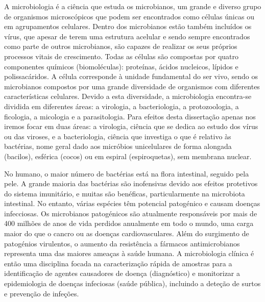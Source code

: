 A microbiologia é a ciência que estuda os microbianos, um grande e diverso grupo de organismos microscópicos que podem ser encontrados como células únicas ou em agrupamentos celulares. Dentro dos microbianos estão também incluídos os vírus, que apesar de terem uma estrutura acelular e sendo sempre encontrados como parte de outros microbianos, são capazes de realizar os seus próprios processos vitais de crescimento. Todas as células são compostas por quatro componentes químicos (biomoléculas): proteínas, ácidos nucleicos, lípidos e polissacáridos. A célula corresponde à unidade fundamental do ser vivo, sendo os microbianos compostos por uma grande diversidade de organismos com diferentes características celulares. Devido a esta diversidade, a microbiologia encontra-se dividida em diferentes áreas: a virologia, a bacteriologia, a protozoologia, a ficologia, a micologia e a parasitologia. Para efeitos desta dissertação apenas nos iremos focar em duas áreas: a virologia, ciência que se dedica ao estudo dos vírus ou das viroses, e a bacteriologia, ciência que investiga o que é relativo às bactérias, nome geral dado aos micróbios unicelulares de forma alongada (bacilos), esférica (cocos) ou em espiral (espiroquetas), sem membrana nuclear. 

No humano, o maior número de bactérias está na flora intestinal, seguido pela pele. A grande maioria das bactérias são inofensivas devido aos efeitos protetivos do sistema imunitário, e muitas são benéficas, particularmente na microbiota intestinal. No entanto, várias espécies têm potencial patogénico e causam doenças infecciosas. Os microbianos patogénicos são atualmente responsáveis por mais de 400 milhões de anos de vida perdidos anualmente em todo o mundo, uma carga maior do que o cancro ou as doenças cardiovasculares. Além do surgimento de patogénios virulentos, o aumento da resistência a fármacos antimicrobianos representa uma das maiores ameaças à saúde humana. A microbiologia clínica é então uma disciplina focada na caracterização rápida de amostras para a identificação de agentes causadores de doença (diagnóstico) e monitorizar a epidemiologia de doenças infeciosas (saúde pública), incluindo a deteção de surtos e prevenção de infeções. 

